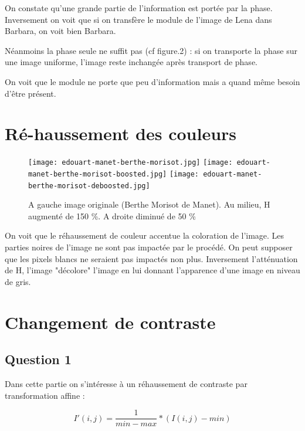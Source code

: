 \documentclass{article}
\begin{document}
On constate qu'une grande partie de l'information est portée par la phase. Inversement on voit que si on transfère le module de l'image de Lena dans Barbara, on voit bien Barbara.

Néanmoins la phase seule ne suffit pas (cf figure.2) : si on transporte la phase sur une image uniforme, l'image reste inchangée après transport de phase. 

On voit que le module ne porte que peu d'information mais a quand même besoin d'être présent. 

\newpage

\section{Ré-haussement des couleurs}


\begin{figure}[h]

	\texttt{[image: edouart-manet-berthe-morisot.jpg]}
	\texttt{[image: edouart-manet-berthe-morisot-boosted.jpg]}
	\texttt{[image: edouart-manet-berthe-morisot-deboosted.jpg]}
  \caption{A gauche image originale (Berthe Morisot de Manet). Au milieu, H augmenté de 150 \%. A droite diminué de 50 \%}
\end{figure}

On voit que le réhaussement de couleur accentue la coloration de l'image. Les parties noires de l'image ne sont pas impactée par le procédé. On peut supposer que les pixels blancs ne seraient pas impactés non plus. Inversement l'atténuation de H, l'image "décolore" l'image en lui donnant l'apparence d'une image en niveau de gris.

\newpage

\section{Changement de contraste}

\subsection*{Question 1}

Dans cette partie on s'intéresse à un réhaussement de contraste par transformation affine :

$$I'(i,j) = \frac{1}{min-max} * (I(i,j) - min)$$
\end{document}
